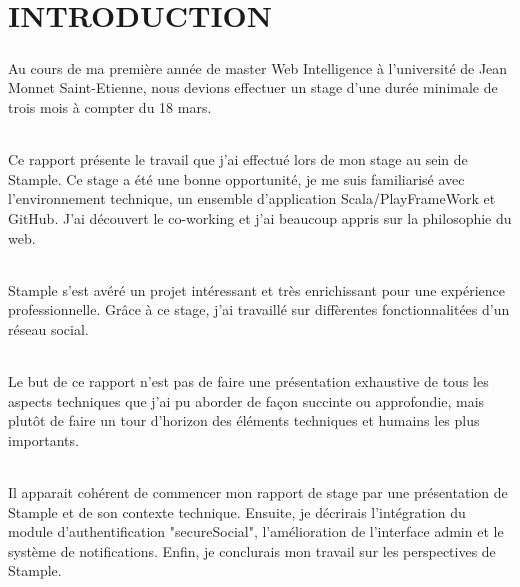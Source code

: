 \chapter{INTRODUCTION}
\paragraph{}
Au cours de ma première année de master Web Intelligence à l'université de Jean Monnet Saint-Etienne, nous devions effectuer un stage d'une durée minimale de trois mois à compter du 18 mars.
\subparagraph{}
Ce rapport présente le travail que j'ai effectué lors de mon stage au sein de Stample.
\newline
Ce stage a été une bonne opportunité, je me suis familiarisé avec l'environnement technique, un ensemble d'application Scala/PlayFrameWork et GitHub.
J'ai découvert le co-working et j'ai beaucoup appris sur la philosophie du web.
\subparagraph{}
Stample s'est avéré un projet intéressant et très enrichissant pour une expérience professionnelle. Gr\^ace à ce stage, j'ai travaillé sur diffèrentes fonctionnalitées d'un réseau social.
\subparagraph{}
Le but de ce rapport n’est pas de faire une présentation exhaustive de tous les aspects techniques que j’ai pu aborder de façon succinte ou approfondie, mais plutôt de faire un tour d’horizon des éléments techniques et humains les plus importants.
\subparagraph{}
Il apparait cohérent de commencer mon rapport de stage par une présentation de Stample et de son contexte technique. Ensuite, je décrirais l'intégration du module d'authentification "secureSocial", l'amélioration de l'interface admin  et le système de notifications. Enfin, je conclurais  mon travail sur les perspectives de Stample.